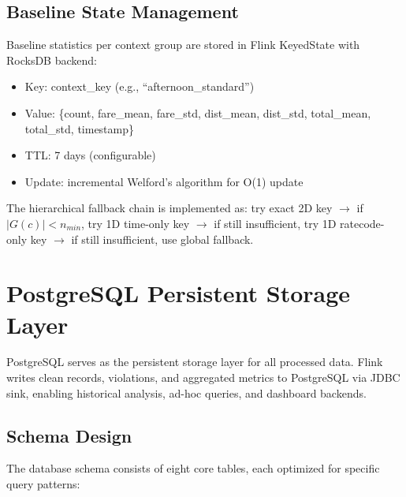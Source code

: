\subsection{Baseline State Management}

Baseline statistics per context group are stored in Flink KeyedState with RocksDB backend:

\begin{itemize}
    \item Key: context\_key (e.g., ``afternoon\_standard'')
    \item Value: \{count, fare\_mean, fare\_std, dist\_mean, dist\_std, total\_mean, total\_std, timestamp\}
    \item TTL: 7 days (configurable)
    \item Update: incremental Welford's algorithm for O(1) update
\end{itemize}

The hierarchical fallback chain is implemented as: try exact 2D key $\to$ if $|G(c)| < n_{min}$, try 1D time-only key $\to$ if still insufficient, try 1D ratecode-only key $\to$ if still insufficient, use global fallback.

\section{PostgreSQL Persistent Storage Layer}

PostgreSQL serves as the persistent storage layer for all processed data. Flink writes clean records, violations, and aggregated metrics to PostgreSQL via JDBC sink, enabling historical analysis, ad-hoc queries, and dashboard backends.

\subsection{Schema Design}

The database schema consists of eight core tables, each optimized for specific query patterns:

